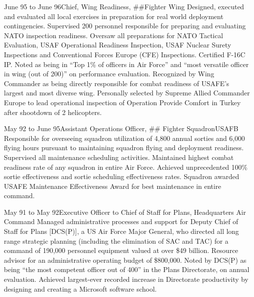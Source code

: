 \documentclass[10pt,letterpaper,lmodern]{mtvita}
\begin{document}
\begin{job}{June 95 to June 96}{Chief, Wing Readiness, \#\#Fighter Wing}{}{%
Designed, executed and evaluated all local exercises in preparation
for real world deployment contingencies. Supervised 200 personnel responsible for preparing and evaluating NATO inspection
readiness. Oversaw all preparations for NATO Tactical Evaluation, USAF Operational Readiness Inspection, USAF Nuclear Surety
Inspections and Conventional Forces Europe (CFE) Inspections. Certified F-16C IP.
}
\accomplishment Noted as being in ``Top 1\% of officers in Air Force'' and ``most versatile officer in wing (out of 200)'' on performance evaluation.
\accomplishment Recognized by Wing Commander as being directly responsible for combat readiness of USAFE's largest and most diverse wing.
\accomplishment Personally selected by Supreme Allied Commander Europe to lead operational inspection of Operation Provide Comfort in Turkey
after shootdown of 2 helicopters.
\end{job}

\begin{job}{May 92 to June 95}{Assistant Operations Officer, \#\# Fighter Squadron}{USAFB}{%
Responsible for overseeing squadron
utilization of 4,800 annual sorties and 6,000 flying hours pursuant to maintaining squadron flying and deployment readiness.
Supervised all maintenance scheduling activities.
}
\accomplishment Maintained highest combat readiness rate of any squadron in entire Air Force.
\accomplishment Achieved unprecedented 100\% sortie effectiveness and sortie scheduling effectiveness rates.
\accomplishment Squadron awarded USAFE Maintenance Effectiveness Award for best maintenance in entire command.
\end{job}

\begin{job}{May 91 to May 92}{Executive Officer to Chief of Staff for Plans, Headquarters Air Command}{}{%
Managed administrative
processes and support for Deputy Chief of Staff for Plans [DCS(P)], a US Air Force Major General, who directed all long range
strategic planning (including the elimination of SAC and TAC) for a command of 190,000 personnel equipment valued at over \$49
billion. Resource advisor for an administrative operating budget of \$800,000.
}
\accomplishment Noted by DCS(P) as being ``the most competent officer out of 400'' in the Plans Directorate, on annual evaluation.
\accomplishment Achieved largest-ever recorded increase in Directorate productivity by designing and creating a Microsoft software school.
\end{job}
\end{document}
